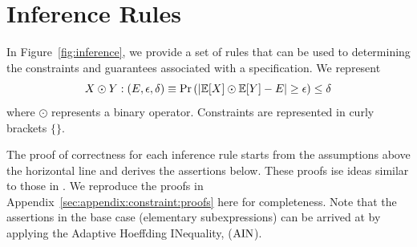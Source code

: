 \section{Inference Rules}
\label{sec:appendix:inference-rules}
In Figure~\ref{fig:inference}, we provide a set of rules that can be used to determining the constraints and guarantees associated with a specification.
We represent
\[ 
X \odot Y : (E, \epsilon, \delta) \equiv \Pr\left(| \mathbb{E}[X] \odot \mathbb{E}[Y] - E | \geq \epsilon \right) \leq \delta
\]
where $\odot$ represents a binary operator.
Constraints are represented in curly brackets $\{ \}$.

The proof of correctness for each inference rule starts from the assumptions above the horizontal line and derives the assertions below. 
These proofs ise ideas similar to those in \cite{bastani2019probabilistic}.
We reproduce the proofs in Appendix~\ref{sec:appendix:constraint:proofs} here for completeness.
Note that the assertions in the base case (elementary subexpressions) can be arrived at by applying the Adaptive Hoeffding INequality, ($\rm{AIN}$). 

